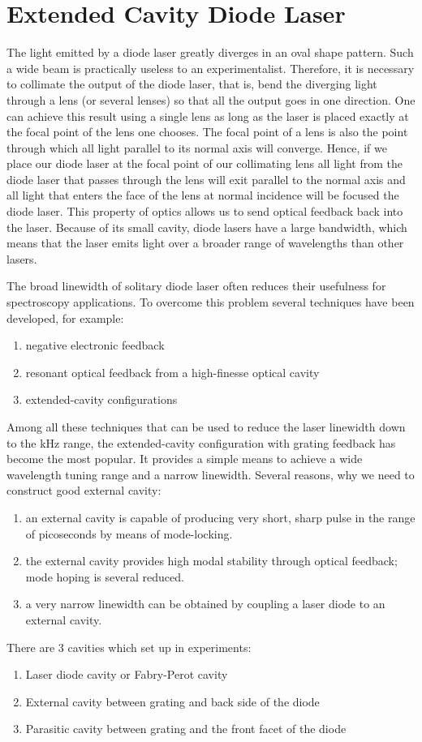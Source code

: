 \section{Extended Cavity Diode Laser}

The light emitted by a diode laser greatly diverges in an oval shape pattern. Such a wide beam is practically useless to an experimentalist. Therefore, it is necessary to collimate the output of the diode laser, that is, bend the diverging light through a lens (or several lenses) so that all the output goes in one direction. One can achieve this result using a single lens as long as the laser is placed exactly at the focal  point of the lens one chooses. The focal point of a lens is also the point through which all light parallel to its normal axis will converge. Hence, if we place our diode laser at the focal point of our collimating lens all light from the diode laser that passes through the lens will exit parallel to the normal axis and all light that enters the face of the lens at normal incidence will be focused the diode laser. This property of optics allows us to send optical feedback back into the laser. Because of its small cavity, diode lasers have a large bandwidth, which means that the laser emits light over a broader range of wavelengths than other lasers. 

The broad linewidth of solitary diode laser often reduces their usefulness for spectroscopy applications. To overcome this problem several techniques have been developed, for example:
\begin{enumerate}
\item negative electronic feedback
\item resonant optical feedback from a high-finesse optical cavity
\item extended-cavity configurations
\end{enumerate}
Among all these techniques that can be used to reduce the laser linewidth down to the kHz range, the extended-cavity configuration with grating feedback has become the most popular. It provides a simple means to achieve a wide wavelength tuning range and a narrow linewidth.
Several reasons, why we need to construct good external cavity:
\begin{enumerate}
\item an external cavity is capable of producing very short, sharp pulse in the range of picoseconds by means of mode-locking.
\item the external cavity provides high modal stability through optical feedback; mode hoping is several reduced.
\item a very narrow linewidth can be obtained by coupling a laser diode to an external cavity.
\end{enumerate}
There are 3 cavities which set up in experiments:
\begin{enumerate}
\item Laser diode cavity or Fabry-Perot cavity
\item External cavity between grating and back side of the diode 
\item Parasitic cavity between grating and the front facet of the diode
\end{enumerate}

